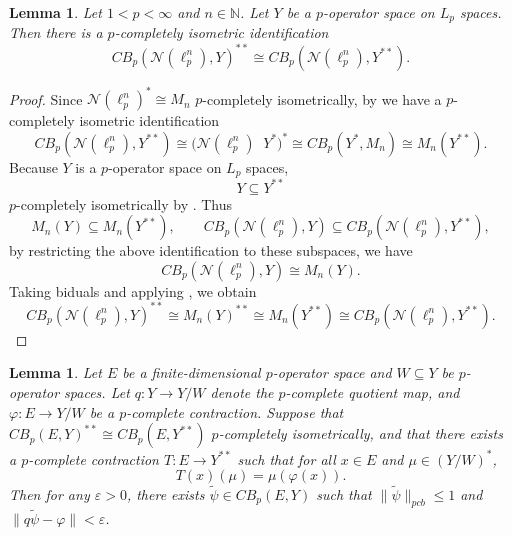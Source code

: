 \documentclass[12pt]{article}
\newtheorem{lemma}[theorem]{Lemma}
\newcommand{\pcb}{pcb}
\newcommand{\CBp}{CB_p}
\newcommand{\otimesp}{\mathop{\overset{\wedge p}{\otimes}}}
\begin{document}
\begin{lemma}\label{lem:N-lpn-bidual-cb}
Let $1<p<\infty$ and $n\in\mathbb{N}$. Let $Y$ be a $p$-operator space on $L_p$ spaces.
Then there is a $p$-completely isometric identification
\[
        \CBp(\mathcal{N}(\ell_p^n),Y)^{**} \cong \CBp(\mathcal{N}(\ell_p^n),Y^{**}).
\]
\end{lemma}

\begin{proof}
Since $\mathcal{N}(\ell_p^n)^*\cong M_n$ $p$-completely isometrically, by
\cite[\S4.2]{Daws2007} we have a $p$-completely isometric identification
\[
        \CBp(\mathcal{N}(\ell_p^n),Y^{**})
        \cong \big(\mathcal{N}(\ell_p^n) \otimesp Y^*\big)^*
        \cong \CBp(Y^*, M_n)
        \cong M_n(Y^{**}).
\]
Because $Y$ is a $p$-operator space on $L_p$ spaces,
\[
        Y\subseteq Y^{**}
\]
$p$-completely isometrically by \cite[Proposition~4.4]{Daws2007}.
Thus
\[
        M_n(Y)\subseteq M_n(Y^{**}),
        \qquad
        \CBp(\mathcal{N}(\ell_p^n),Y)\subseteq \CBp(\mathcal{N}(\ell_p^n),Y^{**}),
\]
by restricting the above identification to these subspaces, we have
\[
        \CBp(\mathcal{N}(\ell_p^n),Y)\cong M_n(Y).
\]
Taking biduals and applying \cite[Theorem~3.6]{ZD14}, we obtain
\[
        \CBp(\mathcal{N}(\ell_p^n),Y)^{**}
        \cong M_n(Y)^{**}
        \cong M_n(Y^{**})
        \cong \CBp(\mathcal{N}(\ell_p^n),Y^{**}).
\]
\end{proof}

\begin{lemma}\label{lem:approx-from-bidual}
Let $E$ be a finite-dimensional $p$-operator space and $W\subseteq Y$ be $p$-operator spaces.
Let $q:Y\to Y/W$ denote the $p$-complete quotient map, and $\varphi:E\to Y/W$ be a $p$-complete contraction.
Suppose that $\CBp(E,Y)^{**} \cong \CBp(E,Y^{**})$ $p$-completely isometrically, and that there exists a $p$-complete contraction $T:E\to Y^{**}$ such that for all $x\in E$ and $\mu\in (Y/W)^*$,
\[
        T(x)(\mu)=\mu(\varphi(x)).
\]
Then for any $\varepsilon>0$, there exists $\widetilde\psi\in\CBp(E,Y)$ such that $\|\widetilde\psi\|_{\pcb}\leq 1$ and $\|q\widetilde\psi-\varphi\|<\varepsilon$.
\end{lemma}
\end{document}
